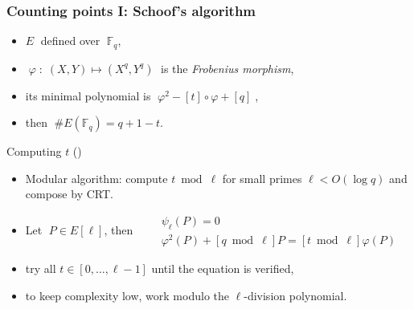 \documentclass[10pt]{beamer}
\newcommand{\card}[1]{\# #1}  %
\newcommand{\F}{\mathbb{F}}  %
\newcommand{\frob}{\varphi}  %
\newcommand{\0}{\mathcal{O}}  %
\begin{document}

\begin{frame}
  \frametitle{Counting points I: Schoof's algorithm}
  
  \begin{theorem}[Hasse]
    \begin{itemize}
    \item $E\;$ defined over $\;\F_q$,
    \item$\;\frob \;:\; (X,Y) \mapsto (X^q,Y^q)\;$ is the
      \emph{Frobenius morphism},
    \item its minimal polynomial is $\;\frob^2-[t]\circ\frob + [q]\;$,
    \item then $\;\card{E(\F_q)} = q + 1 - t$.
    \end{itemize}
  \end{theorem}

  \begin{block}{Computing $t$ (\cite{Scho95})}
    \begin{itemize}
    \item Modular algorithm: compute $t \bmod \ell$ for small primes
      $\ell < O(\log q)$ and compose by CRT.
    \item Let $\;P\in E[\ell]$, then
      $\quad\begin{aligned}
        &\psi_\ell(P) = 0\\
        &\frob^2(P) + [q\bmod\ell]P = [t \bmod \ell]\frob(P)
      \end{aligned}$
    \item try all $t\in[0,\ldots,\ell-1]$ until the equation is verified,
    \item to keep complexity low, work modulo the $\ell$-division
      polynomial.
    \end{itemize}
  \end{block}

\end{frame}

\end{document}
